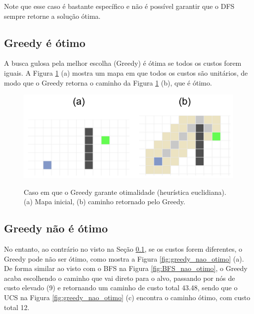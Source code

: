\documentclass[letterpaper]{article} %
\begin{document}
Note que esse caso é bastante específico e não é possível garantir que o DFS
sempre retorne a solução ótima. 

\subsection{Greedy é ótimo}\label{sec:greedy_otimo}

A busca gulosa pela melhor escolha (Greedy) é ótima se todos os custos 
forem iguais. A Figura \ref{fig:greedy_otimo} (a) mostra um mapa em que
todos os custos são unitários, de modo que o Greedy retorna o caminho
da Figura \ref{fig:greedy_otimo} (b), que é ótimo.

\begin{figure}[htb]
	\centering 
    \caption{Caso em que o Greedy garante otimalidade (heurística euclidiana). (a) Mapa inicial, (b)
	caminho retornado pelo Greedy.}
	\includegraphics[width=\columnwidth]{images/greedy_otimo.png}
	\label{fig:greedy_otimo}
\end{figure}

\subsection{Greedy não é ótimo}

No entanto, ao contrário no visto na Seção \ref{sec:greedy_otimo},  
se os custos forem diferentes, o Greedy pode não ser ótimo, como 
mostra a Figura \ref{fig:greedy_nao_otimo} (a). De forma similar ao visto com o BFS 
na Figura \ref{fig:BFS_nao_otimo}, o Greedy acaba escolhendo o caminho que vai direto para 
o alvo, passando por nós de custo elevado (9) e retornando um caminho de custo total 43.48, sendo que 
o UCS na Figura \ref{fig:greedy_nao_otimo} (c) encontra o caminho ótimo, com custo total 12.
\end{document}
